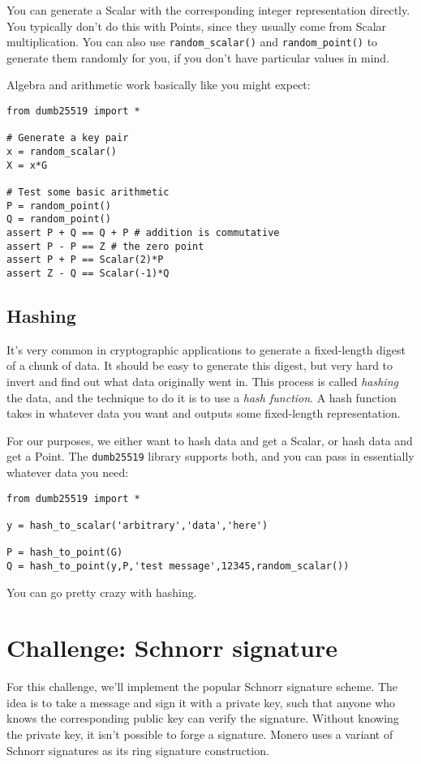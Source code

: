 \documentclass{article}
\begin{document}
You can generate a Scalar with the corresponding integer representation directly. You typically don't do this with Points, since they usually come from Scalar multiplication. You can also use \texttt{random\_scalar()} and \texttt{random\_point()} to generate them randomly for you, if you don't have particular values in mind.

Algebra and arithmetic work basically like you might expect:

\begin{verbatim}
from dumb25519 import *

# Generate a key pair
x = random_scalar()
X = x*G

# Test some basic arithmetic
P = random_point()
Q = random_point()
assert P + Q == Q + P # addition is commutative
assert P - P == Z # the zero point
assert P + P == Scalar(2)*P
assert Z - Q == Scalar(-1)*Q
\end{verbatim}

\subsection{Hashing}
It's very common in cryptographic applications to generate a fixed-length digest of a chunk of data. It should be easy to generate this digest, but very hard to invert and find out what data originally went in. This process is called \textit{hashing} the data, and the technique to do it is to use a \textit{hash function}. A hash function takes in whatever data you want and outputs some fixed-length representation.

For our purposes, we either want to hash data and get a Scalar, or hash data and get a Point. The \texttt{dumb25519} library supports both, and you can pass in essentially whatever data you need:

\begin{verbatim}
from dumb25519 import *

y = hash_to_scalar('arbitrary','data','here')

P = hash_to_point(G)
Q = hash_to_point(y,P,'test message',12345,random_scalar())
\end{verbatim}
You can go pretty crazy with hashing.


\section{Challenge: Schnorr signature}
For this challenge, we'll implement the popular Schnorr signature scheme. The idea is to take a message and sign it with a private key, such that anyone who knows the corresponding public key can verify the signature. Without knowing the private key, it isn't possible to forge a signature. Monero uses a variant of Schnorr signatures as its ring signature construction.
\end{document}
